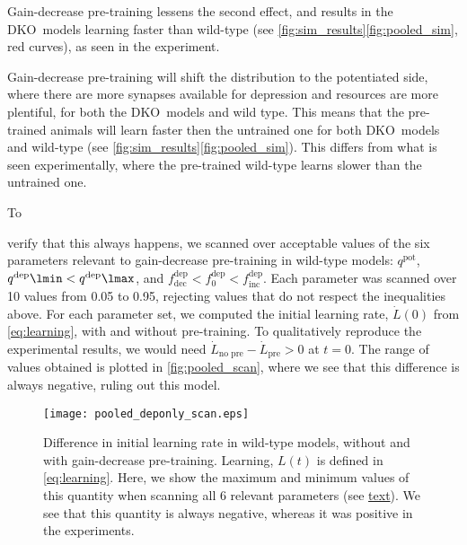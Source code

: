 \documentclass[10pt]{article}
\newcommand{\pot}{^{\text{pot}}}
\newcommand{\dep}{^{\text{dep}}}
\newcommand{\norm}{_0}
\newcommand{\inc}{_{\text{inc}}}
\newcommand{\dec}{_{\text{dec}}}
\newcommand{\KO}{DKO}
\begin{document}
Gain-decrease pre-training lessens the second effect, and results in the \KO\ models learning faster than wild-type (see \autoref{fig:sim_results}\ref{fig:pooled_sim}, %
red curves),
as seen in the experiment.

Gain-decrease pre-training will shift the distribution to the potentiated side, where there are more synapses available for depression and resources are more plentiful, for both the \KO\ models and wild type.
This means that the pre-trained animals will learn faster then the untrained one for both \KO\ models and wild-type (see \autoref{fig:sim_results}\ref{fig:pooled_sim}). %
This differs from what is seen experimentally, where the pre-trained wild-type learns slower than the untrained one.

\hypertarget{par:pooled_scan}{To} verify that this always happens, we scanned over acceptable values of the six parameters relevant to gain-decrease pre-training in wild-type models: $q\pot$, $q\dep\lmin < q\dep\lmax$, and $f\dep\dec < f\dep\norm < f\dep\inc$.
Each parameter was scanned over 10 values from 0.05 to 0.95, rejecting values that do not respect the inequalities above.
For each parameter set, we computed the initial learning rate, $\dot{L}(0)$ from \eqref{eq:learning}, with and without pre-training.
To qualitatively reproduce the experimental results, we would need $\dot{L}_\text{no pre} - \dot{L}_\text{pre} > 0$ at $t = 0$.
The range of values obtained is plotted in \autoref{fig:pooled_scan}, where we see that this difference is always negative, ruling out this model.

\begin{figure}
\begin{preview}
  \begin{center}
  \texttt{[image: pooled\_deponly\_scan.eps]}
  \end{center}
\end{preview}
  \caption{Difference in initial learning rate in wild-type models, without and with gain-decrease pre-training.
  Learning, $L(t)$ is defined in \eqref{eq:learning}.
  Here, we show the maximum and minimum values of this quantity when scanning all 6 relevant parameters (see \protect\hyperlink{par:pooled_scan}{text}).
  We see that this quantity is always negative, whereas it was positive in the experiments.
  }\label{fig:pooled_scan}
\end{figure}
\end{document}

